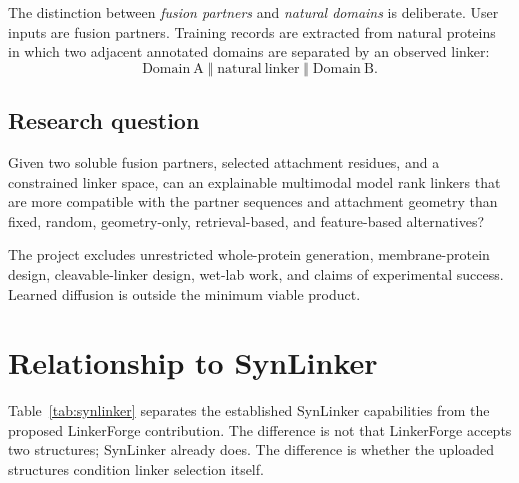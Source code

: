 \documentclass[10pt,a4paper]{article}
\begin{document}
The distinction between \emph{fusion partners} and \emph{natural domains} is deliberate. User inputs are fusion partners. Training records are extracted from natural proteins in which two adjacent annotated domains are separated by an observed linker:
\begin{equation}
  \mathrm{Domain\ A} \;\Vert\; \mathrm{natural\ linker} \;\Vert\; \mathrm{Domain\ B}.
\end{equation}

\subsection{Research question}

Given two soluble fusion partners, selected attachment residues, and a constrained linker space, can an explainable multimodal model rank linkers that are more compatible with the partner sequences and attachment geometry than fixed, random, geometry-only, retrieval-based, and feature-based alternatives?

The project excludes unrestricted whole-protein generation, membrane-protein design, cleavable-linker design, wet-lab work, and claims of experimental success. Learned diffusion is outside the minimum viable product.

\section{Relationship to SynLinker}

Table~\ref{tab:synlinker} separates the established SynLinker capabilities from the proposed LinkerForge contribution. The difference is not that LinkerForge accepts two structures; SynLinker already does. The difference is whether the uploaded structures condition linker selection itself.
\end{document}
